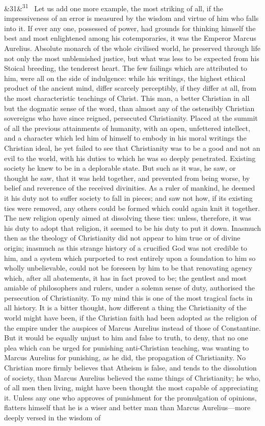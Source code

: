 \documentclass[12pt]{article}
\newcommand{\para}[1][]{\par\noindent\ifx&#1&\else\textsuperscript{\footnotesize #1}~\fi}
\begin{document}
\para[31] Let us add one more example, the most striking of all, if the impressiveness of an error is measured by the wisdom and virtue of him who falls into it. If ever any one, possessed of power, had grounds for thinking himself the best and most enlightened among his cotemporaries, it was the Emperor Marcus Aurelius. Absolute monarch of the whole civilised world, he preserved through life not only the most unblemished justice, but what was less to be expected from his Stoical breeding, the tenderest heart. The few failings which are attributed to him, were all on the side of indulgence: while his writings, the highest ethical product of the ancient mind, differ scarcely perceptibly, if they differ at all, from the most characteristic teachings of Christ. This man, a better Christian in all but the dogmatic sense of the word, than almost any of the ostensibly Christian sovereigns who have since reigned, persecuted Christianity. Placed at the summit of all the previous attainments of humanity, with an open, unfettered intellect, and a character which led him of himself to embody in his moral writings the Christian ideal, he yet failed to see that Christianity was to be a good and not an evil to the world, with his duties to which he was so deeply penetrated. Existing society he knew to be in a deplorable state. But such as it was, he saw, or thought he saw, that it was held together, and prevented from being worse, by belief and reverence of the received divinities. As a ruler of mankind, he deemed it his duty not to suffer society to fall in pieces; and saw not how, if its existing ties were removed, any others could be formed which could again knit it together. The new religion openly aimed at dissolving these ties: unless, therefore, it was his duty to adopt that religion, it seemed to be his duty to put it down. Inasmuch then as the theology of Christianity did not appear to him true or of divine origin; inasmuch as this strange history of a crucified God was not credible to him, and a system which purported to rest entirely upon a foundation to him so wholly unbelievable, could not be foreseen by him to be that renovating agency which, after all abatements, it has in fact proved to be; the gentlest and most amiable of philosophers and rulers, under a solemn sense of duty, authorised the persecution of Christianity. To my mind this is one of the most tragical facts in all history. It is a bitter thought, how different a thing the Christianity of the world might have been, if the Christian faith had been adopted as the religion of the empire under the auspices of Marcus Aurelius instead of those of Constantine. But it would be equally unjust to him and false to truth, to deny, that no one plea which can be urged for punishing anti-Christian teaching, was wanting to Marcus Aurelius for punishing, as he did, the propagation of Christianity. No Christian more firmly believes that Atheism is false, and tends to the dissolution of society, than Marcus Aurelius believed the same things of Christianity; he who, of all men then living, might have been thought the most capable of appreciating it. Unless any one who approves of punishment for the promulgation of opinions, flatters himself that he is a wiser and better man than Marcus Aurelius---more deeply versed in the wisdom of 
\end{document}
